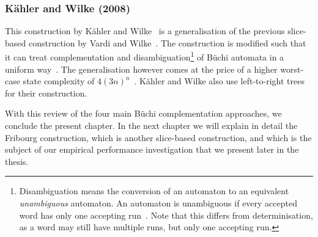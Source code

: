 
\subsubsection{Kähler and Wilke (2008)}
\label{2_kw08}
This construction by Kähler and Wilke~\cite{2008_kaehler} is a generalisation of the previous slice-based construction by Vardi and Wilke~\cite{vardi2007automata}. The construction is modified such that it can treat complementation and disambiguation\footnote{Disambiguation means the conversion of an automaton to an equivalent \textit{unambiguous} automaton. An automaton is unambiguous if every accepted word has only one accepting run~\cite{2012_mohri}. Note that this differs from determinisation, as a word may still have multiple runs, but only one accepting run.} of Büchi automata in a uniform way~\cite{2011_tsai}. The generalisation however comes at the price of a higher worst-case state complexity of $4(3n)^n$~\cite{2011_tsai}. Kähler and Wilke also use left-to-right trees for their construction.




With this review of the four main Büchi complementation approaches, we conclude the present chapter. In the next chapter we will explain in detail the Fribourg construction, which is another slice-based construction, and which is the subject of our empirical performance investigation that we present later in the thesis.






